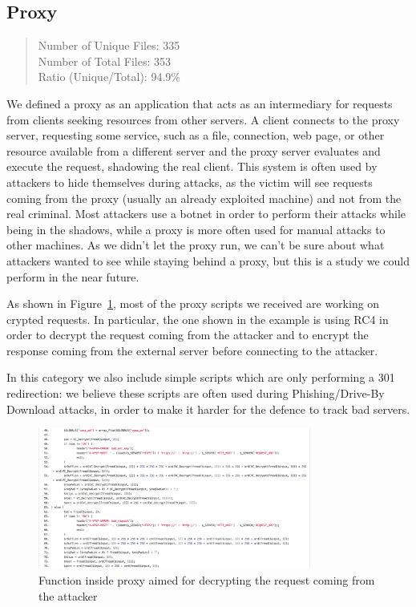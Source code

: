 \subsection{Proxy}

\begin{quote}
Number of Unique Files: 335\\
Number of Total Files: 353\\
Ratio (Unique/Total): 94.9\%
\end{quote}

We defined a proxy as an application that acts as an intermediary for requests from clients seeking resources from other servers. A client connects to the proxy server, requesting some service, such as a file, connection, web page, or other resource available from a different server and the proxy server evaluates and execute the request, shadowing the real client. This system is often used by attackers to hide themselves during attacks, as the victim will see requests coming from the proxy (usually an already exploited machine) and not from the real criminal.
Most attackers use a botnet in order to perform their attacks while being in the shadows, while a proxy is more often used for manual attacks to other machines. As we didn't let the proxy run, we can't be sure about what attackers wanted to see while staying behind a proxy, but this is a study we could perform in the near future.

As shown in Figure~\ref{fig:Proxy}, most of the proxy scripts we received are working on crypted requests. In particular, the one shown in the example is using RC4 in order to decrypt the request coming from the attacker and to encrypt the response coming from the external server before connecting to the attacker.

In this category we also include simple scripts which are only performing a 301 redirection: we believe these scripts are often used during Phishing/Drive-By Download attacks, in order to make it harder for the defence to track bad servers.

\begin{figure}[H]
\centerline{\includegraphics[width=0.8\textwidth]{Images/Proxy.jpg}}
\caption{Function inside proxy aimed for decrypting the request coming from the attacker\label{fig:Proxy}}
\end{figure}

